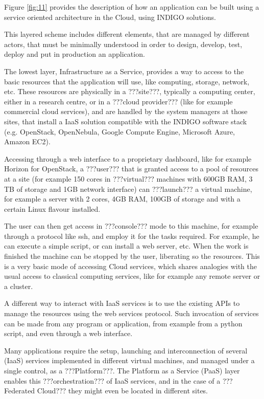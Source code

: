 \documentclass{article}
\begin{document}
Figure \ref{fig:11} provides the description of how an application can be built using a service oriented architecture in the Cloud, using INDIGO solutions. 

This layered scheme includes different elements, that are managed by different actors, that must be minimally understood in order to design, develop, test, deploy and put in production an application.

The lowest layer, Infrastructure as a Service, provides a way to access to the basic resources that the application will use, like computing, storage, network, etc. These resources are physically in a ???site???, typically a computing center, either in a research centre, or in a ???cloud provider??? (like for example commercial cloud services), and are handled by the system managers at those sites, that install a IaaS solution compatible with the INDIGO software stack (e.g. OpenStack, OpenNebula, Google Compute Engine, Microsoft Azure, Amazon EC2). 

Accessing through a web interface to a proprietary dashboard, like for example Horizon for OpenStack, a ???user??? that is granted access to a pool of resources at a site (for example 150 cores in ???virtual??? machines with 600GB RAM, 3 TB of storage and 1GB network interface) can ???launch??? a virtual machine, for example a server with 2 cores, 4GB RAM, 100GB of storage and with a certain Linux flavour installed. 

The user can then get access in ???console??? mode to this machine, for example through a protocol like ssh, and employ it for the tasks required. For example, he can execute a simple script, or can install a web server, etc. When the work is finished the machine can be stopped by the user, liberating so the resources. This is a very basic mode of accessing Cloud services, which shares analogies with the usual access to classical computing services, like for example any remote server or a cluster.

A different way to interact with IaaS services is to use the existing APIs to manage the resources using the web services protocol. Such invocation of services can be made from any program or application, from example from a python script, and even through a web interface. 

Many applications require the setup, launching and interconnection of several (IaaS) services implemented in different virtual machines, and managed under a single control, as a ???Platform???. The Platform as a Service (PaaS) layer enables this ???orchestration??? of IaaS services, and in the case of a ???Federated Cloud??? they might even be located in different sites. 
\end{document}
